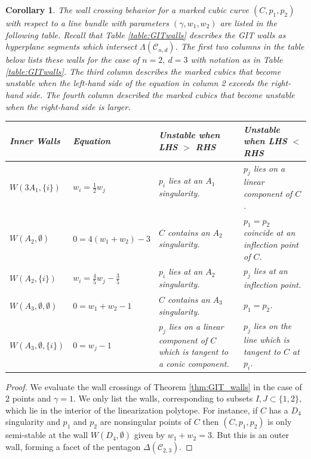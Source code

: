 \documentclass{amsart}
\newcommand{\mc}{\mathcal}
\numberwithin{equation}{section}
\newtheorem{cor}[prop]{Corollary}
\theoremstyle{definition}
\begin{document}
\begin{cor} \label{cor:2pts}
The wall crossing behavior for a marked cubic curve $(C,p_1, p_2)$ with respect to a line bundle with parameters $(\gamma, w_1, w_2)$ are listed in the following table. Recall that Table \ref{table:GITwalls} describes the GIT walls as hyperplane segments which intersect $\Lambda(\mc{C}_{n,d})$.
The first two columns in the table below lists these walls for the case of $n=2, \ d=3$ with notation as in Table \ref{table:GITwalls}. The third column describes the marked cubics that become unstable when the left-hand side of the equation in column 2 exceeds the right-hand side. The fourth column described the marked cubics that become unstable when the right-hand side is larger. \\

 \begin{tabular}{
 |p{2cm}| p{3cm}|p{5cm}|p{5cm}|
 }
\hline 
Inner Walls & Equation &  Unstable when LHS $>$ RHS & Unstable when LHS $<$ RHS \\
\hline 

$W(3A_1, \{i\})$ & $w_i = \frac{1}{2} w_j$ & $p_i$ lies at an $A_1$ singularity. & $p_j$ lies on a linear component of $C$. \\

\hline
$W(A_2, \emptyset)$ &  $0  = 4( w_1 + w_2)  - 3$  & $C$ contains an $A_2$ singularity.  & $p_1=p_2$ coincide at an inflection point of $C$.  \\


\hline
$W(A_2, \{i\})$ &  $ w_i  = \frac{4}{5}w_j  - \frac{3}{5}$  & $p_i$ lies at an $A_2$ singularity.  & $p_j$ lies at an inflection point.  \\

\hline
$W(A_3, \emptyset, \emptyset)$ &  $0 =  w_1+w_2 - 1$ & $C$ contains an $A_3$ singularity.  &  $p_1=p_2$. \\

\hline
$W(A_3, \emptyset, \{i\})$ &  $0 =  w_j - 1$ & $p_j$ lies on a linear component of $C$ which is tangent to a conic component.  &  $p_j$ lies on the line which is tangent to $C$ at $p_i$. \\

\hline

\end{tabular}
    
\end{cor}

\begin{proof}
    We evaluate the wall crossings of Theorem \ref{thm:GIT_walls} in the case of $2$ points and $\gamma = 1$. We only list the walls, corresponding to subsets $I, J \subset \{1,2\}$, which lie in the interior of the linearization polytope. For instance, if $C$ has a $D_4$ singularity and $p_1$ and $p_2$ are nonsingular points of $C$ then $(C,p_1, p_2)$ is only semi-stable at the wall $W(D_4, \emptyset)$ given by $w_1 + w_2 = 3.$ But this is an outer wall, forming a facet of the pentagon $\Delta(\mc{C}_{2,3}).$
\end{proof}
\end{document}
